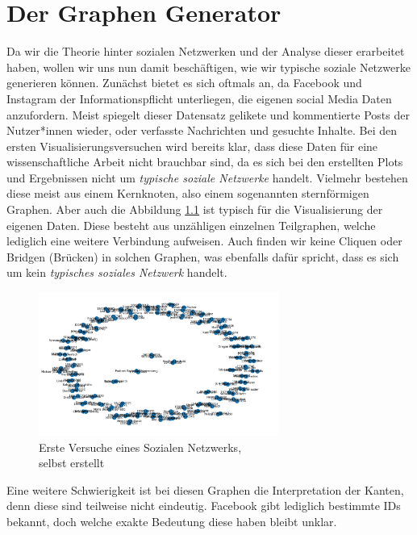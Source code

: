 \chapter{Der Graphen Generator}\label{ch:generierung}
Da wir die Theorie hinter sozialen Netzwerken und der Analyse dieser erarbeitet haben, wollen wir uns nun damit beschäftigen, wie wir typische soziale Netzwerke generieren können. 
Zunächst bietet es sich oftmals an, da Facebook und Instagram der Informationspflicht unterliegen, die eigenen social Media Daten anzufordern. Meist spiegelt dieser Datensatz gelikete und kommentierte Posts der Nutzer*innen wieder, oder verfasste Nachrichten und gesuchte Inhalte.
Bei den ersten Visualisierungsversuchen wird bereits klar, dass diese Daten für eine wissenschaftliche Arbeit nicht brauchbar sind, da es sich bei den erstellten Plots und Ergebnissen nicht um \textit{ typische soziale Netzwerke} handelt. Vielmehr bestehen diese meist aus einem Kernknoten, also einem sogenannten sternförmigen Graphen. Aber auch die Abbildung \ref{fig:OwnData} ist typisch für die Visualisierung der eigenen Daten. Diese besteht aus unzähligen einzelnen Teilgraphen, welche lediglich eine weitere Verbindung aufweisen. Auch finden wir keine Cliquen oder Bridgen (Brücken) in solchen Graphen, was ebenfalls dafür spricht, dass es sich um kein \textit{typisches soziales Netzwerk} handelt. \\
\FloatBarrier
\begin{figure}[h!]
    \centering
    \includegraphics[width=0.7\textwidth]{Graphics/PlotOwnData.png}
    \caption{Erste Versuche eines Sozialen Netzwerks, \\
    selbst erstellt}
    \label{fig:OwnData}
\end{figure}
\FloatBarrier

Eine weitere Schwierigkeit ist bei diesen Graphen die Interpretation der Kanten, denn diese sind teilweise nicht eindeutig. 
Facebook gibt lediglich bestimmte IDs bekannt, doch welche exakte Bedeutung diese haben bleibt unklar.

